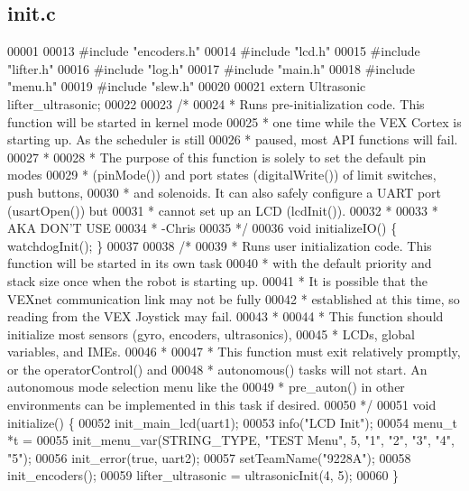 \subsection{init.\+c}
\label{a00101_source}

\begin{DoxyCode}
00001 
00013 \textcolor{preprocessor}{#include "encoders.h"}
00014 \textcolor{preprocessor}{#include "lcd.h"}
00015 \textcolor{preprocessor}{#include "lifter.h"}
00016 \textcolor{preprocessor}{#include "log.h"}
00017 \textcolor{preprocessor}{#include "main.h"}
00018 \textcolor{preprocessor}{#include "menu.h"}
00019 \textcolor{preprocessor}{#include "slew.h"}
00020 
00021 \textcolor{keyword}{extern} Ultrasonic lifter_ultrasonic;
00022 
00023 \textcolor{comment}{/*}
00024 \textcolor{comment}{ * Runs pre-initialization code. This function will be started in kernel mode}
00025 \textcolor{comment}{ * one time while the VEX Cortex is starting up. As the scheduler is still}
00026 \textcolor{comment}{ * paused, most API functions will fail.}
00027 \textcolor{comment}{ *}
00028 \textcolor{comment}{ * The purpose of this function is solely to set the default pin modes}
00029 \textcolor{comment}{ * (pinMode()) and port states (digitalWrite()) of limit switches, push buttons,}
00030 \textcolor{comment}{ * and solenoids. It can also safely configure a UART port (usartOpen()) but}
00031 \textcolor{comment}{ * cannot set up an LCD (lcdInit()).}
00032 \textcolor{comment}{ *}
00033 \textcolor{comment}{ * AKA DON'T USE}
00034 \textcolor{comment}{ * -Chris}
00035 \textcolor{comment}{ */}
00036 \textcolor{keywordtype}{void} initializeIO() \{ watchdogInit(); \}
00037 
00038 \textcolor{comment}{/*}
00039 \textcolor{comment}{ * Runs user initialization code. This function will be started in its own task}
00040 \textcolor{comment}{ * with the default priority and stack size once when the robot is starting up.}
00041 \textcolor{comment}{ * It is possible that the VEXnet communication link may not be fully}
00042 \textcolor{comment}{ * established at this time, so reading from the VEX Joystick may fail.}
00043 \textcolor{comment}{ *}
00044 \textcolor{comment}{ * This function should initialize most sensors (gyro, encoders, ultrasonics),}
00045 \textcolor{comment}{ * LCDs, global variables, and IMEs.}
00046 \textcolor{comment}{ *}
00047 \textcolor{comment}{ * This function must exit relatively promptly, or the operatorControl() and}
00048 \textcolor{comment}{ * autonomous() tasks will not start. An autonomous mode selection menu like the}
00049 \textcolor{comment}{ * pre\_auton() in other environments can be implemented in this task if desired.}
00050 \textcolor{comment}{ */}
00051 \textcolor{keywordtype}{void} initialize() \{
00052   init_main_lcd(uart1);
00053   info(\textcolor{stringliteral}{"LCD Init"});
00054   menu_t *t =
00055       init_menu_var(STRING_TYPE, \textcolor{stringliteral}{"TEST Menu"}, 5, \textcolor{stringliteral}{"1"}, \textcolor{stringliteral}{"2"}, \textcolor{stringliteral}{"3"}, \textcolor{stringliteral}{"4"}, \textcolor{stringliteral}{"5"});
00056   init_error(\textcolor{keyword}{true}, uart2);
00057   setTeamName(\textcolor{stringliteral}{"9228A"});
00058   init_encoders();
00059   lifter_ultrasonic = ultrasonicInit(4, 5);
00060 \}
\end{DoxyCode}
